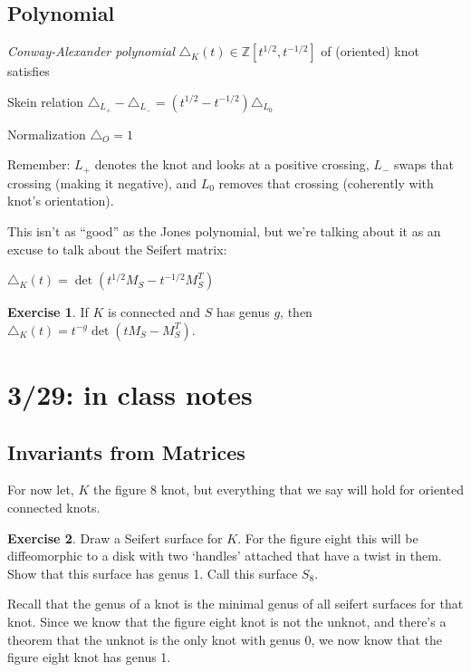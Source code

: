\documentclass[11pt]{article}
\newcommand{\Z}{\mathbb{Z}}
\theoremstyle{plain}
\theoremstyle{definition}
\newtheorem{exercise}{Exercise}
\begin{document}
\subsection{Polynomial}
\textit{Conway-Alexander polynomial} $\triangle_K(t)\in\Z[t^{1/2},t^{-1/2}]$ of (oriented) knot satisfies

Skein relation $\triangle_{L_+}-\triangle_{L_-}=(t^{1/2}-t^{-1/2})\triangle_{L_0}$

Normalization $\triangle_O=1$

\noindent Remember: $L_+$ denotes the knot and looks at a positive crossing, $L_-$ swaps that crossing (making it negative), and $L_0$ removes that crossing (coherently with knot's orientation).

\bigskip
This isn't as ``good'' as the Jones polynomial, but we're talking about it as an excuse to talk about the Seifert matrix:

$\triangle_K(t)=\det(t^{1/2}M_S-t^{-1/2} M_S^T)$

\begin{exercise}
If $K$ is connected and $S$ has genus $g$, then $\triangle_K(t)=t^{-g}\det(tM_S-M_S^T)$.
\end{exercise}




\section{3/29: in class notes}



\subsection{Invariants from Matrices}

For now let, $K$ the figure 8 knot, but everything that we say will hold for oriented connected knots.


\begin{exercise}
  Draw a Seifert surface for $K$. For the figure eight this will be diffeomorphic to a disk with two `handles' attached that have a twist in them. Show that this surface has genus 1. Call this surface $S_8$.
\end{exercise}

Recall that the genus of a knot is the minimal genus of all seifert surfaces for that knot.
Since we know that the figure eight knot is not the unknot, and there's a theorem that the unknot is the only knot with genus 0, we now know that the figure eight knot has genus 1.
\end{document}
